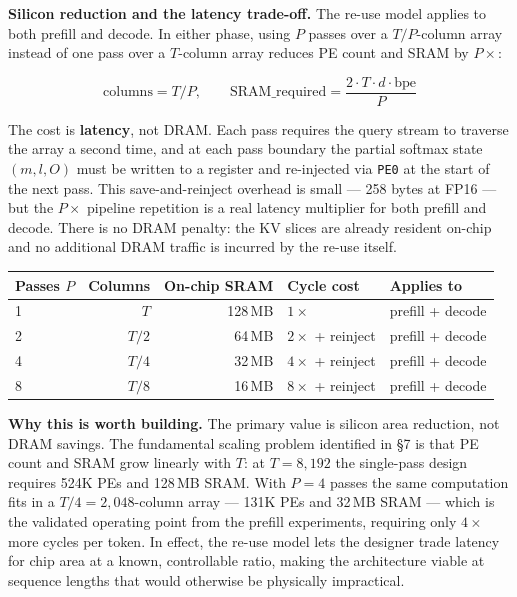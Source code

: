 \documentclass[11pt]{article}
\begin{document}
\textbf{Silicon reduction and the latency trade-off.}
The re-use model applies to both prefill and decode.
In either phase, using \(P\) passes over a \(T/P\)-column
array instead of one pass over a \(T\)-column array reduces
PE count and SRAM by \(P\times\):

\[
\text{columns} = T / P, \qquad
\text{SRAM\_required} = \frac{2 \cdot T \cdot d \cdot \text{bpe}}{P}
\]

The cost is \textbf{latency}, not DRAM.
Each pass requires the query stream to traverse the array
a second time, and at each pass boundary the partial softmax
state \((m, l, O)\) must be written to a register and
re-injected via \texttt{PE0} at the start of the next pass.
This save-and-reinject overhead is small --- 258 bytes at
FP16 --- but the \(P\times\) pipeline repetition is a real
latency multiplier for both prefill and decode.
There is no DRAM penalty: the KV slices are already resident
on-chip and no additional DRAM traffic is incurred by
the re-use itself.

\begin{center}
\begin{tabular}{lrrll}
\toprule
Passes \(P\) & Columns & On-chip SRAM & Cycle cost & Applies to \\
\midrule
1 & \(T\)     & 128\,MB & \(1\times\) & prefill + decode \\
2 & \(T/2\)   &  64\,MB & \(2\times\) + reinject & prefill + decode \\
4 & \(T/4\)   &  32\,MB & \(4\times\) + reinject & prefill + decode \\
8 & \(T/8\)   &  16\,MB & \(8\times\) + reinject & prefill + decode \\
\bottomrule
\end{tabular}
\end{center}

\textbf{Why this is worth building.}
The primary value is silicon area reduction, not DRAM savings.
The fundamental scaling problem identified in \S7 is that
PE count and SRAM grow linearly with \(T\): at \(T = 8{,}192\)
the single-pass design requires 524K PEs and 128\,MB SRAM.
With \(P = 4\) passes the same computation fits in a
\(T/4 = 2{,}048\)-column array --- 131K PEs and 32\,MB SRAM
--- which is the validated operating point from the prefill
experiments, requiring only \(4\times\) more cycles per token.
In effect, the re-use model lets the designer trade latency
for chip area at a known, controllable ratio, making the
architecture viable at sequence lengths that would otherwise
be physically impractical.
\end{document}
